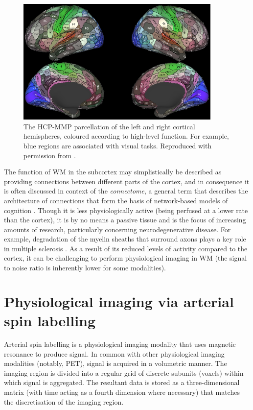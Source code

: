 \documentclass[12pt]{report}
\begin{document}
\begin{figure}
\centering
\includegraphics[width = 0.9\textwidth]{hcp_mmp.png}
\caption{The HCP-MMP parcellation of the left and right cortical hemispheres, coloured according to high-level function. For example, blue regions are associated with visual tasks. Reproduced with permission from \cite{hcp_mmp}.}
\label{fig_hcp_mmp}
\end{figure}

The function of WM in the subcortex may simplistically be described as providing connections between different parts of the cortex, and in consequence it is often discussed in context of the \textit{connectome}, a general term that describes the architecture of connections that form the basis of network-based models of cognition \cite{Sporns2005}. Though it is less physiologically active (being perfused at a lower rate than the cortex), it is by no means a passive tissue and is the focus of increasing amounts of research, particularly concerning neurodegenerative disease. For example, degradation of the myelin sheaths that surround axons plays a key role in multiple sclerosis \cite{Shafee2015}. As a result of its reduced levels of activity compared to the cortex, it can be challenging to perform physiological imaging in WM (the signal to noise ratio is inherently lower for some modalities). 

\section{Physiological imaging via arterial spin labelling}

Arterial spin labelling is a physiological imaging modality that uses magnetic resonance to produce signal. In common with other physiological imaging modalities (notably, PET), signal is acquired in a volumetric manner. The imaging region is divided into a regular grid of discrete subunits (voxels) within which signal is aggregated. The resultant data is stored as a three-dimensional matrix (with time acting as a fourth dimension where necessary) that matches the discretisation of the imaging region.
\end{document}
